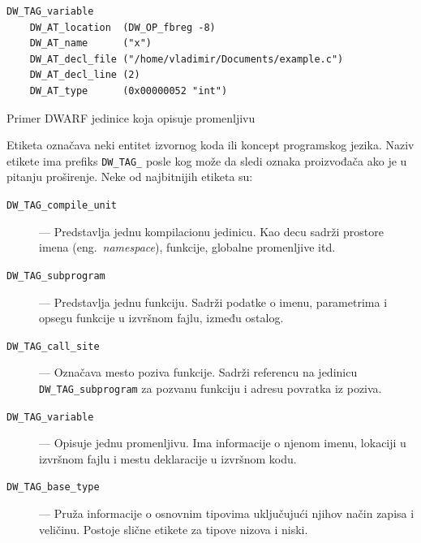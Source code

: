 \documentclass[12pt,oneside]{memoir}
\begin{document}
\begin{listing}[!ht]
\begin{verbatim}
DW_TAG_variable
    DW_AT_location  (DW_OP_fbreg -8)
    DW_AT_name      ("x")
    DW_AT_decl_file ("/home/vladimir/Documents/example.c")
    DW_AT_decl_line (2)
    DW_AT_type      (0x00000052 "int")
\end{verbatim}
\caption{Primer DWARF jedinice koja opisuje promenljivu}
\label{lst:dwarf_variable}
\end{listing}

Etiketa označava neki entitet izvornog koda ili koncept programskog jezika.
Naziv etikete ima prefiks \verb|DW_TAG_| posle kog može da sledi oznaka proizvođača ako je u pitanju proširenje.
Neke od najbitnijih etiketa su:
\begin{description}
  \item[\texttt{DW\_TAG\_compile\_unit}] --- Predstavlja jednu kompilacionu jedinicu. Kao decu sadrži prostore imena (eng.~{\em namespace}), funkcije, globalne promenljive itd.
  \item[\texttt{DW\_TAG\_subprogram}] --- Predstavlja jednu funkciju. Sadrži podatke o imenu, parametrima i opsegu funkcije u izvršnom fajlu, između ostalog.
  \item[\texttt{DW\_TAG\_call\_site}] --- Označava mesto poziva funkcije. Sadrži referencu na jedinicu \verb|DW_TAG_subprogram| za pozvanu funkciju i adresu povratka iz poziva.
  \item[\texttt{DW\_TAG\_variable}] --- Opisuje jednu promenljivu. Ima informacije o njenom imenu, lokaciji u izvršnom fajlu i mestu deklaracije u izvršnom kodu.
  \item[\texttt{DW\_TAG\_base\_type}] --- Pruža informacije o osnovnim tipovima uključujući njihov način zapisa i veličinu. Postoje slične etikete za tipove nizova i niski.
\end{description}
\end{document}
